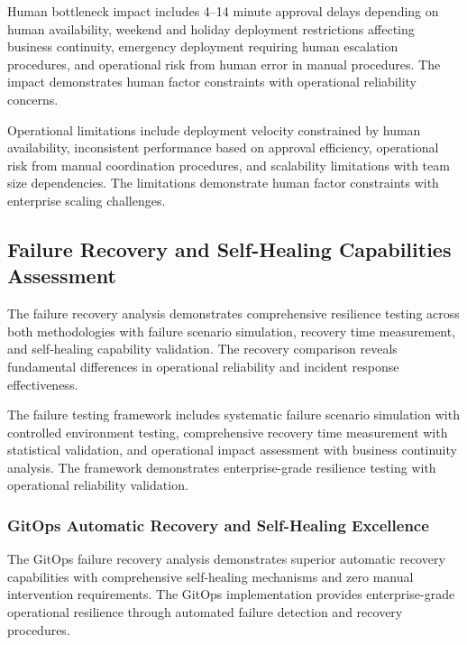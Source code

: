 Human bottleneck impact includes 4--14 minute approval delays depending on human availability, weekend and holiday deployment restrictions affecting business continuity, emergency deployment requiring human escalation procedures, and operational risk from human error in manual procedures. The impact demonstrates human factor constraints with operational reliability concerns.

Operational limitations include deployment velocity constrained by human availability, inconsistent performance based on approval efficiency, operational risk from manual coordination procedures, and scalability limitations with team size dependencies. The limitations demonstrate human factor constraints with enterprise scaling challenges.


\subsection{Failure Recovery and Self-Healing Capabilities Assessment}
\label{subsec:failure_recovery}

The failure recovery analysis demonstrates comprehensive resilience testing across both methodologies with failure scenario simulation, recovery time measurement, and self-healing capability validation. The recovery comparison reveals fundamental differences in operational reliability and incident response effectiveness.

The failure testing framework includes systematic failure scenario simulation with controlled environment testing, comprehensive recovery time measurement with statistical validation, and operational impact assessment with business continuity analysis. The framework demonstrates enterprise-grade resilience testing with operational reliability validation.

\subsubsection{GitOps Automatic Recovery and Self-Healing Excellence}

The GitOps failure recovery analysis demonstrates superior automatic recovery capabilities with comprehensive self-healing mechanisms and zero manual intervention requirements. The GitOps implementation provides enterprise-grade operational resilience through automated failure detection and recovery procedures.


